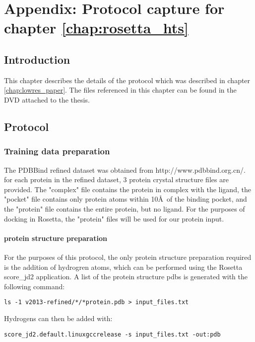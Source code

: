 \chapter{Appendix:  Protocol capture for chapter \ref{chap:rosetta_hts}}

\section{Introduction}

This chapter describes the details of the protocol which was described in chapter \ref{chap:lowres_paper}.
The files referenced in this chapter can be found in the DVD attached to the thesis.

\section{Protocol}

\subsection{Training data preparation}
\label{subsec:training_data_prep}
The PDBBind refined dataset was obtained from http://www.pdbbind.org.cn/.
for each protein in the refined dataset, 3 protein crystal structure files are provided.
The "complex" file contains the protein in complex with the ligand, the "pocket" file contains only protein atoms within 10\AA\ of the binding pocket, and the "protein" file contains the entire protein, but no ligand.
For the purposes of docking in Rosetta, the "protein" files will be used for our protein input.

\subsubsection{protein structure preparation}

For the purposes of this protocol, the only protein structure preparation required is the addition of hydrogren atoms, which can be performed using the Rosetta score\_jd2 application.
A list of the protein structure pdbs is generated with the following command:
\singlespace
\begin{Verbatim}
ls -1 v2013-refined/*/*protein.pdb > input_files.txt
\end{Verbatim}
\doublespace
Hydrogens can then be added with:
\singlespace
\begin{Verbatim}
score_jd2.default.linuxgccrelease -s input_files.txt -out:pdb
\end{Verbatim}
\doublespace

